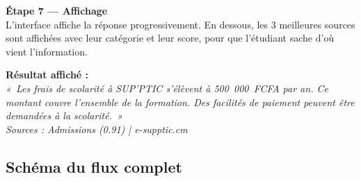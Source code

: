 \documentclass[11pt,a4paper]{article}
\begin{document}
\begin{exemple}
\vspace{0.4cm}
\textbf{Étape 7 --- Affichage} \\
L'interface affiche la réponse progressivement. En dessous,
les 3 meilleures sources sont affichées avec leur catégorie
et leur score, pour que l'étudiant sache d'où vient l'information.

\vspace{0.4cm}
\textbf{Résultat affiché :} \\
\textit{«~Les frais de scolarité à SUP'PTIC s'élèvent à 500~000~FCFA
par an. Ce montant couvre l'ensemble de la formation. Des facilités
de paiement peuvent être demandées à la scolarité.~»} \\
\vspace{0.1cm}
\textit{Sources : Admissions (0.91) | e-supptic.cm}

\end{exemple}

\clearpage

\subsection{Schéma du flux complet}
\end{document}

